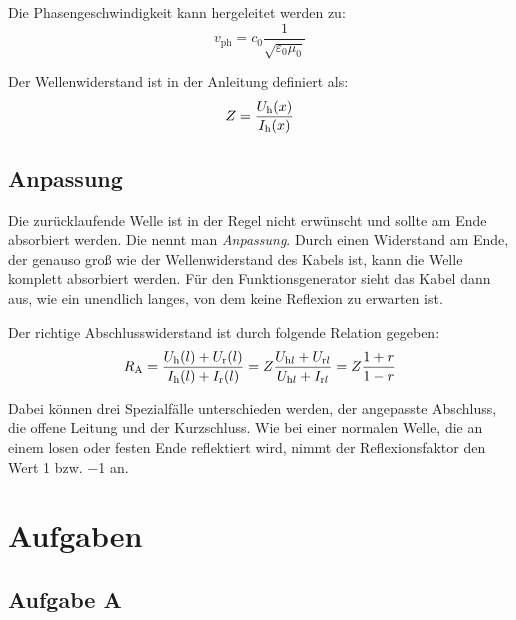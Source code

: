Die Phasengeschwindigkeit kann hergeleitet werden zu:
\begin{equation}
	\label{eq:1.13}
	v_\text{ph} = c_0 \frac{1}{\sqrt{\varepsilon_0 \mu_0}}
\end{equation}

Der Wellenwiderstand ist in der Anleitung definiert als:
\begin{equation}
	\label{eq:1.14}
	Z = \frac{U_\text h (x)}{I_\text h (x)}
\end{equation}

\subsection{Anpassung}

Die zurücklaufende Welle ist in der Regel nicht erwünscht und sollte am Ende
absorbiert werden. Die nennt man \emph{Anpassung}. Durch einen Widerstand am
Ende, der genauso groß wie der Wellenwiderstand des Kabels ist, kann die Welle
komplett absorbiert werden. Für den Funktionsgenerator sieht das Kabel dann
aus, wie ein unendlich langes, von dem keine Reflexion zu erwarten ist.

Der richtige Abschlusswiderstand ist durch folgende Relation gegeben:
\begin{equation}
	\label{eq:1.17}
	R_\text A
	= \frac{U_\text h (l) + U_\text r (l)}{I_\text h (l) + I_\text r (l)}
	= Z \frac{U_{\text h l} + U_{\text r l}}{U_{\text h l} + I_{\text r l}}
	= Z \frac{1+r}{1-r}
\end{equation}

Dabei können drei Spezialfälle unterschieden werden, der angepasste Abschluss,
die offene Leitung und der Kurzschluss. Wie bei einer normalen Welle, die an
einem losen oder festen Ende reflektiert wird, nimmt der Reflexionsfaktor den
Wert \num{+1} bzw. \num{-1} an.


\section{Aufgaben}

\subsection{Aufgabe A}

